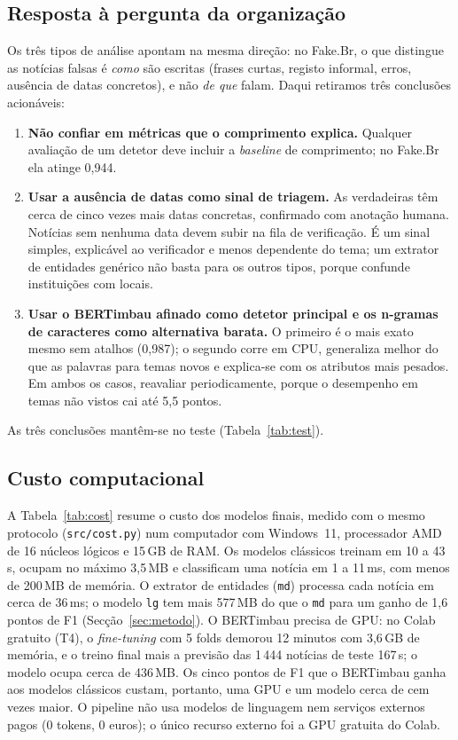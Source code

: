 \subsection{Resposta à pergunta da organização}
Os três tipos de análise apontam na mesma direção: no Fake.Br, o que distingue as notícias falsas
é \emph{como} são escritas (frases curtas, registo informal, erros, ausência de datas
concretos), e não \emph{de que} falam. Daqui retiramos três conclusões acionáveis:
\begin{enumerate}
\item \textbf{Não confiar em métricas que o comprimento explica.} Qualquer avaliação de um detetor
deve incluir a \emph{baseline} de comprimento; no Fake.Br ela atinge 0,944.
\item \textbf{Usar a ausência de datas como sinal de triagem.} As verdadeiras têm cerca de cinco
vezes mais datas concretas, confirmado com anotação humana. Notícias sem nenhuma data devem subir na
fila de verificação. É um sinal simples, explicável ao verificador e menos dependente do tema; um
extrator de entidades genérico não basta para os outros tipos, porque confunde instituições com locais.
\item \textbf{Usar o BERTimbau afinado como detetor principal e os n-gramas de caracteres como
alternativa barata.} O primeiro é o mais exato mesmo sem atalhos (0,987); o segundo corre em CPU,
generaliza melhor do que as palavras para temas novos e explica-se com os atributos mais pesados.
Em ambos os casos, reavaliar periodicamente, porque o desempenho em temas não vistos cai até 5,5 pontos.
\end{enumerate}
As três conclusões mantêm-se no teste (Tabela~\ref{tab:test}).

\subsection{Custo computacional}
A Tabela~\ref{tab:cost} resume o custo dos modelos finais, medido com o mesmo protocolo
(\texttt{src/cost.py}) num computador com Windows~11, processador AMD de 16 núcleos lógicos e 15\,GB de
RAM. Os modelos clássicos treinam em 10 a 43\,s, ocupam no máximo 3,5\,MB e classificam uma notícia
em 1 a 11\,ms, com menos de 200\,MB de memória. O extrator de entidades (\texttt{md}) processa cada
notícia em cerca de 36\,ms; o modelo \texttt{lg} tem mais 577\,MB do que o \texttt{md} para um
ganho de 1,6 pontos de F1 (Secção~\ref{sec:metodo}). O BERTimbau precisa de GPU: no Colab gratuito
(T4), o \emph{fine-tuning} com 5 folds demorou 12 minutos com 3,6\,GB de memória, e o treino final
mais a previsão das 1\,444 notícias de teste 167\,s; o modelo ocupa cerca de 436\,MB. Os cinco
pontos de F1 que o BERTimbau ganha aos modelos clássicos custam, portanto, uma GPU e um modelo cerca
de cem vezes maior. O pipeline não usa modelos de linguagem nem serviços externos pagos (0 tokens,
0 euros); o único recurso externo foi a GPU gratuita do Colab.


